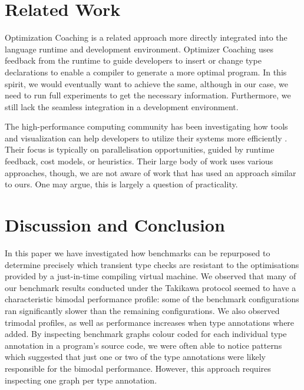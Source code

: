 \documentclass[sigplan,10pt,review,screen]{acmart}\settopmatter{printfolios=true}
\begin{document}

\section{Related Work}
\label{s-rel}

Optimization Coaching
\citep{St-Amour:2012:OCO} is a related approach more
directly integrated into the language runtime and development environment.
Optimizer Coaching uses feedback from the runtime to guide developers
to insert or change type declarations 
to enable a compiler to generate a more optimal program.
In this spirit, we would eventually want to achieve the same, although
in our case,
we need to run full experiments to get the necessary information.
Furthermore, we still lack the seamless integration in a development environment.

The high-performance computing community has been investigating how
tools and visualization can help developers to utilize their systems
more efficiently \citep{Papenhausen:2016:IVT,daSilva:2019:PSV}.
Their focus is typically on parallelisation opportunities,
guided by runtime feedback, cost models, or heuristics. 
Their large body of work \citep{Isaacs:2014:PerfViz} uses various approaches,
though, we are not aware of work that has used an approach similar to ours.
One may argue, this is largely a question of practicality.



\section{Discussion and Conclusion}
\label{s-concl}

In this paper we have investigated how benchmarks can be
repurposed to determine precisely which transient type checks are
resistant to the optimisations provided by a just-in-time compiling
virtual machine.  We observed that many of our benchmark results
conducted under the Takikawa protocol 
seemed to have a characteristic bimodal performance profile: some
of the benchmark configurations ran significantly slower than
the remaining configurations. We also observed trimodal profiles, as well as performance increases when type annotations where added.
By inspecting benchmark graphs colour coded for each individual type annotation in a program's source code, we were often able to notice patterns which suggested
that just one or two of the type annotations were likely responsible for
the bimodal performance.
However, this approach requires inspecting one graph per type annotation.
\end{document}
